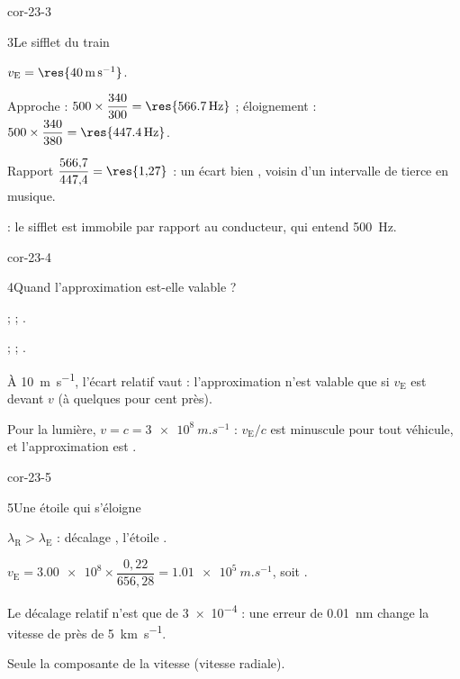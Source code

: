 \begin{blocLivre}{cor-23-3}
\begin{corrige}{3}{Le sifflet du train}
\begin{questions}
\item $v_\mathrm{E}=\res{\qty{40}{m.s^{-1}}}$.
\item Approche : $500\times\dfrac{340}{300}=\res{\qty{566,7}{Hz}}$ ; éloignement : $500\times\dfrac{340}{380}=\res{\qty{447,4}{Hz}}$.
\item Rapport $\dfrac{566{,}7}{447{,}4}=\res{1{,}27}$ : un écart bien , voisin d'un intervalle de tierce en musique.
\item {} : le sifflet est immobile par rapport au conducteur, qui entend \qty{500}{Hz}.
\end{questions}
\end{corrige}
\end{blocLivre}
\begin{blocLivre}{cor-23-4}
\begin{corrige}{4}{Quand l'approximation est-elle valable ?}
\begin{questions}
\item {} ;  ; .
\item {} ;  ; .
\item À \qty{10}{m.s^{-1}}, l'écart relatif vaut  : l'approximation n'est valable que si $v_\mathrm{E}$ est
 devant $v$ (à quelques pour cent près).
\item Pour la lumière, $v=c=\qty{3e8}{m.s^{-1}}$ : $v_\mathrm{E}/c$ est minuscule pour tout véhicule, et l'approximation est
.
\end{questions}
\end{corrige}
\end{blocLivre}
\begin{blocLivre}{cor-23-5}
\begin{corrige}{5}{Une étoile qui s'éloigne}
\begin{questions}
\item $\lambda_\mathrm{R}>\lambda_\mathrm{E}$ : décalage , l'étoile .
\item $v_\mathrm{E}=\num{3.00e8}\times\dfrac{0{,}22}{656{,}28}=\qty{1,01e5}{m.s^{-1}}$, soit .
\item Le décalage relatif n'est que de \num{3e-4} : une erreur de \qty{0,01}{nm} change la vitesse de près de \qty{5}{km.s^{-1}}.
\item Seule la composante de la vitesse  (vitesse radiale).
\end{questions}
\end{corrige}
\end{blocLivre}
